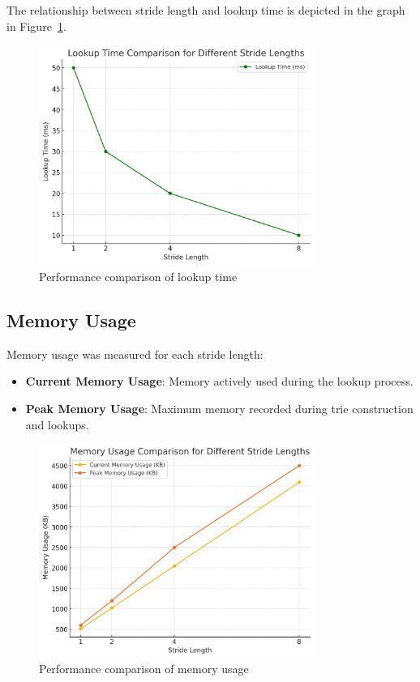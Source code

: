 \documentclass[12pt	]{article}
\begin{document}
\noindent The relationship between stride length and lookup time is depicted in the graph in Figure~\ref{fig:Performance comparison of lookup time}.

\begin{figure}[h!]
	\centering
	\includegraphics[width=0.8\textwidth]{Images/img10.png}
	\caption{Performance comparison of lookup time}
	\label{fig:Performance comparison of lookup time}
\end{figure}




\subsection{Memory Usage}
Memory usage was measured for each stride length:
\begin{itemize}
	\item \textbf{Current Memory Usage}: Memory actively used during the lookup process.
	\item \textbf{Peak Memory Usage}: Maximum memory recorded during trie construction and lookups.
\end{itemize}


\begin{figure}[h!]
	\centering
	\includegraphics[width=0.8\textwidth]{Images/img11.png}
	\caption{Performance comparison of memory usage}
	\label{fig:Performance comparison of memory usage}
\end{figure}
\end{document}
